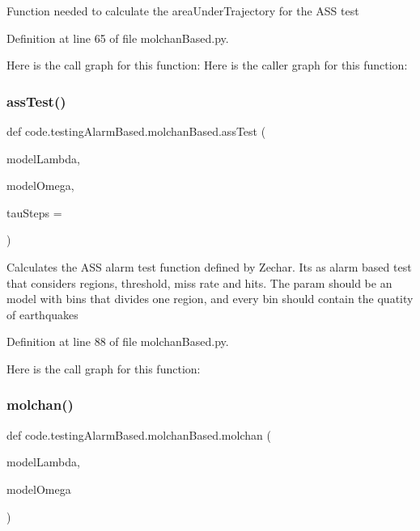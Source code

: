 \begin{DoxyVerb}Function needed to calculate the areaUnderTrajectory for the ASS test
\end{DoxyVerb}
 

Definition at line 65 of file molchan\+Based.\+py.

Here is the call graph for this function\+:
Here is the caller graph for this function\+:
\mbox{\label{namespacecode_1_1testing_alarm_based_1_1molchan_based_a1963447bb2c467f0bbeb68c24474f548}} 
\subsubsection{\texorpdfstring{ass\+Test()}{assTest()}}
{\footnotesize\ttfamily def code.\+testing\+Alarm\+Based.\+molchan\+Based.\+ass\+Test (\begin{DoxyParamCaption}\item[{}]{model\+Lambda,  }\item[{}]{model\+Omega,  }\item[{}]{tau\+Steps = {} }\end{DoxyParamCaption})}

\begin{DoxyVerb}Calculates the ASS alarm test function defined by Zechar. 
Its as alarm based test that considers regions, threshold, miss rate and hits.
The param should be an model with bins that divides one region, and every bin should contain the quatity of earthquakes
\end{DoxyVerb}
 

Definition at line 88 of file molchan\+Based.\+py.

Here is the call graph for this function\+:
\mbox{\label{namespacecode_1_1testing_alarm_based_1_1molchan_based_a58209ab6fe99f49980840a862f96ee5a}} 
\subsubsection{\texorpdfstring{molchan()}{molchan()}}
{\footnotesize\ttfamily def code.\+testing\+Alarm\+Based.\+molchan\+Based.\+molchan (\begin{DoxyParamCaption}\item[{}]{model\+Lambda,  }\item[{}]{model\+Omega }\end{DoxyParamCaption})}

